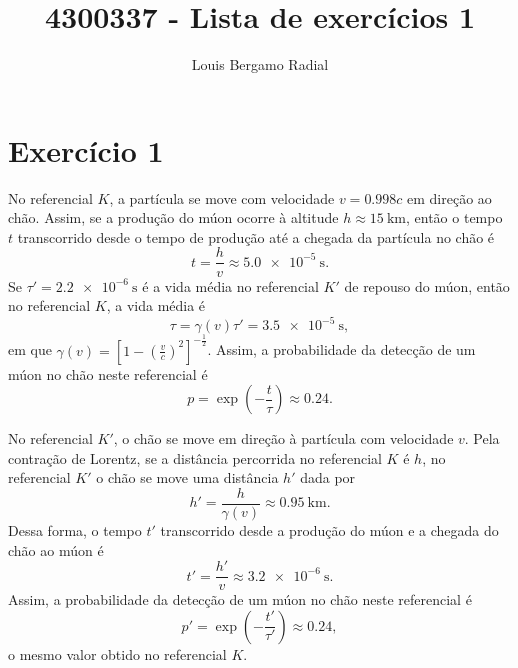 \documentclass[12pt,a4paper]{article}
\title{4300337 - Lista de exercícios 1}
\author{Louis Bergamo Radial}
\numberwithin{equation}{section}
\begin{document}
\maketitle
\section*{Exercício 1}
No referencial \(K\), a partícula se move com velocidade \(v = 0.998c\) em direção ao chão. Assim, se a produção do múon ocorre à altitude \(h \approx \SI{15}{\kilo\meter}\), então o tempo \(t\) transcorrido desde o tempo de produção até a chegada da partícula no chão é
\begin{equation*}
    t = \frac{h}{v} \approx \SI{5.0e-5}{\second}.
\end{equation*}
Se \(\tau' = \SI{2.2e-6}{\second}\) é a vida média no referencial \(K'\) de repouso do múon, então no referencial \(K\), a vida média é
\begin{equation*}
    \tau = \gamma(v)\tau' = \SI{3.5e-5}{\second},
\end{equation*}
em que \(\gamma(v) = \left[1 - \left(\frac{v}{c}\right)^2\right]^{-\frac12}\).
Assim, a probabilidade da detecção de um múon no chão neste referencial é
\begin{equation*}
    p = \exp{\left(-\frac{t}{\tau}\right)} \approx 0.24.
\end{equation*}

No referencial \(K'\), o chão se move em direção à partícula com velocidade \(v\). Pela contração de Lorentz, se a distância percorrida no referencial \(K\) é \(h\), no referencial \(K'\) o chão se move uma distância \(h'\) dada por
\begin{equation*}
    h' = \frac{h}{\gamma(v)} \approx \SI{0.95}{\kilo\meter}.
\end{equation*}
Dessa forma, o tempo \(t'\) transcorrido desde a produção do múon e a chegada do chão ao múon é
\begin{equation*}
    t' = \frac{h'}{v} \approx \SI{3.2e-6}{\second}.
\end{equation*}
Assim, a probabilidade da detecção de um múon no chão neste referencial é
\begin{equation*}
    p' = \exp{\left(-\frac{t'}{\tau'}\right)} \approx 0.24,
\end{equation*}
o mesmo valor obtido no referencial \(K\).
\end{document}
